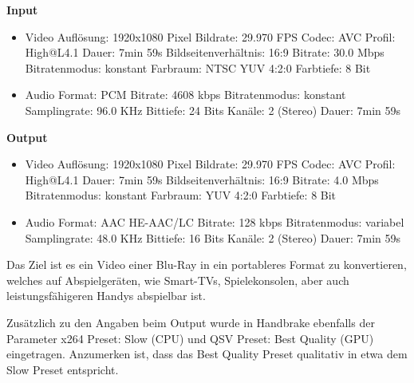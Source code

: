 \textbf{Input}
\begin{itemize}
	\item Video
	\subitem Auflösung: 1920x1080 Pixel
	\subitem Bildrate: 29.970 FPS
	\subitem Codec: AVC
	\subitem Profil: High@L4.1
	\subitem Dauer: 7min 59s
	\subitem Bildseitenverhältnis: 16:9
	\subitem Bitrate: 30.0 Mbps
	\subitem Bitratenmodus: konstant
	\subitem Farbraum: NTSC YUV 4:2:0
	\subitem Farbtiefe: 8 Bit
	\item Audio
	\subitem Format: PCM
	\subitem Bitrate: 4608 kbps
	\subitem Bitratenmodus: konstant
	\subitem Samplingrate: 96.0 KHz
	\subitem Bittiefe: 24 Bits
	\subitem Kanäle: 2 (Stereo)
	\subitem Dauer: 7min 59s
\end{itemize}

\textbf{Output}
\begin{itemize}
	\item Video
	\subitem Auflösung: 1920x1080 Pixel
	\subitem Bildrate: 29.970 FPS
	\subitem Codec: AVC
	\subitem Profil: High@L4.1
	\subitem Dauer: 7min 59s
	\subitem Bildseitenverhältnis: 16:9
	\subitem Bitrate: 4.0 Mbps
	\subitem Bitratenmodus: konstant
	\subitem Farbraum: YUV 4:2:0
	\subitem Farbtiefe: 8 Bit
	\item Audio
	\subitem Format: AAC HE-AAC/LC
	\subitem Bitrate: 128 kbps
	\subitem Bitratenmodus: variabel
	\subitem Samplingrate: 48.0 KHz
	\subitem Bittiefe: 16 Bits
	\subitem Kanäle: 2 (Stereo)
	\subitem Dauer: 7min 59s
\end{itemize}



Das Ziel ist es ein Video einer Blu-Ray in ein portableres Format zu konvertieren, welches auf Abspielgeräten, wie Smart-TVs, Spielekonsolen, aber auch leistungsfähigeren Handys abspielbar ist.

Zusätzlich zu den Angaben beim Output wurde in Handbrake ebenfalls der Parameter x264 Preset: Slow (CPU) und QSV Preset: Best Quality (GPU) eingetragen.
Anzumerken ist, dass das Best Quality Preset qualitativ in etwa dem Slow Preset entspricht.



